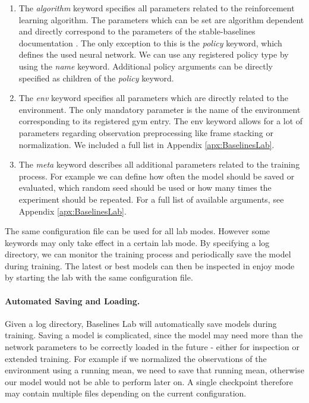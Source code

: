 \begin{enumerate}
    \item The \textit{algorithm} keyword specifies all parameters related to the reinforcement learning algorithm. The parameters which can be set are algorithm dependent and directly correspond to the parameters of the stable-baselines documentation \cite{stable-baselines-docs}. The only exception to this is the \textit{policy} keyword, which defines the used neural network. We can use any registered policy type by using the \textit{name} keyword. Additional policy arguments can be directly specified as children of the \textit{policy} keyword.
    \item The \textit{env} keyword specifies all parameters which are directly related to the environment. The only mandatory parameter is the name of the environment corresponding to its registered gym entry. The env keyword allows for a lot of parameters regarding observation preprocessing like frame stacking or normalization. We included a full list in Appendix \ref{apx:BaselinesLab}. 
    \item  The \textit{meta} keyword describes all additional parameters related to the training process. For example we can define how often the model should be saved or evaluated, which random seed should be used or how many times the experiment should be repeated. For a full list of available arguments, see Appendix \ref{apx:BaselinesLab}.
\end{enumerate}

The same configuration file can be used for all lab modes. However some keywords may only take effect in a certain lab mode. By specifying a log directory, we can monitor the training process and periodically save the model during training. The latest or best models can then be inspected in enjoy mode by starting the lab with the same configuration file. 

\paragraph{Automated Saving and Loading.}
Given a log directory, Baselines Lab will automatically save models during training. Saving a model is complicated, since the model may need more than the network parameters to be correctly loaded in the future - either for inspection or extended training. For example if we normalized the observations of the environment using a running mean, we need to save that running mean, otherwise our model would not be able to perform later on. A single checkpoint therefore may contain multiple files depending on the current configuration.

